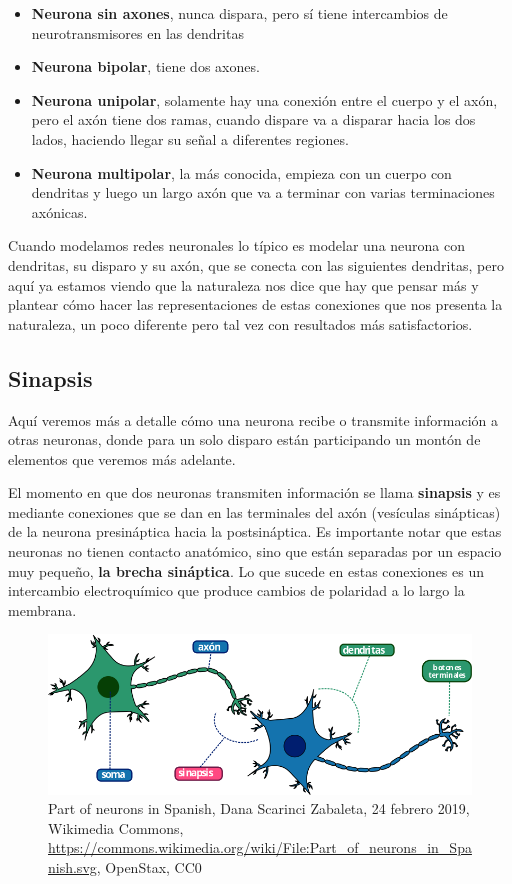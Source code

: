 \begin{itemize}
\item \textbf{Neurona sin axones}, nunca dispara, pero sí tiene intercambios de neurotransmisores en las dendritas 
\item \textbf{Neurona bipolar}, tiene dos axones. 
\item \textbf{Neurona unipolar}, solamente hay una conexión entre el cuerpo y el axón, pero el axón tiene dos ramas, cuando dispare va a disparar hacia los dos lados, haciendo llegar su señal a diferentes regiones. 
\item \textbf{Neurona multipolar}, la más conocida, empieza con un cuerpo con dendritas y luego un largo axón que va a terminar con varias terminaciones axónicas. 
\end{itemize}


Cuando modelamos redes neuronales lo típico es modelar una neurona con dendritas, su disparo y su axón, que se conecta con las siguientes dendritas, pero aquí ya estamos viendo que la naturaleza nos dice que hay que pensar más y plantear cómo hacer las representaciones de estas conexiones que nos presenta la naturaleza, un poco diferente pero tal vez con resultados más satisfactorios.




\subsection{Sinapsis}


Aquí veremos más a detalle cómo una neurona recibe o transmite información a otras neuronas, donde para un solo disparo están participando un montón de elementos que veremos más adelante.


 El momento en que dos neuronas transmiten información se llama \textbf{sinapsis} y es mediante conexiones que se dan en las terminales del axón (vesículas sinápticas) de la neurona presináptica hacia la postsináptica. Es importante notar que estas neuronas no tienen contacto anatómico, sino que están separadas por un espacio muy pequeño, \textbf{la brecha sináptica}. Lo que sucede en estas conexiones es un intercambio electroquímico que produce cambios de polaridad a lo largo la membrana. 




\begin{figure}[h]
 \centering
 \includegraphics[scale=0.5]{../Figuras/Part_of_neurons_in_Spanish.png}
 \caption{Part of neurons in Spanish, Dana Scarinci Zabaleta, 24 febrero 2019, Wikimedia Commons, \url{https://commons.wikimedia.org/wiki/File:Part_of_neurons_in_Spanish.svg}, OpenStax, CC0}
 \label{fig:sinapsisN}
\end{figure}


